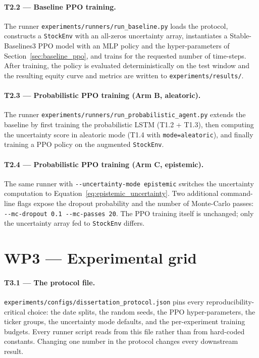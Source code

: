 \paragraph{T2.2 --- Baseline PPO training.} The runner \texttt{experiments/runners/run\_baseline.py} loads the protocol, constructs a \texttt{StockEnv} with an all-zeros uncertainty array, instantiates a Stable-Baselines3 PPO model with an MLP policy and the hyper-parameters of Section~\ref{sec:baseline_ppo}, and trains for the requested number of time-steps. After training, the policy is evaluated deterministically on the test window and the resulting equity curve and metrics are written to \texttt{experiments/results/}.

\paragraph{T2.3 --- Probabilistic PPO training (Arm B, aleatoric).} The runner \texttt{experiments/runners/run\_probabilistic\_agent.py} extends the baseline by first training the probabilistic LSTM (T1.2 + T1.3), then computing the uncertainty score in aleatoric mode (T1.4 with \texttt{mode=\textquotesingle aleatoric\textquotesingle}), and finally training a PPO policy on the augmented \texttt{StockEnv}.

\paragraph{T2.4 --- Probabilistic PPO training (Arm C, epistemic).} The same runner with \texttt{-{}-uncertainty-mode epistemic} switches the uncertainty computation to Equation~\ref{eq:epistemic_uncertainty}. Two additional command-line flags expose the dropout probability and the number of Monte-Carlo passes: \texttt{-{}-mc-dropout 0.1 -{}-mc-passes 20}. The PPO training itself is unchanged; only the uncertainty array fed to \texttt{StockEnv} differs.

\section{WP3 --- Experimental grid}
\label{sec:wp3}

\paragraph{T3.1 --- The protocol file.} \texttt{experiments/configs/dissertation\_protocol.json} pins every reproducibility-critical choice: the date splits, the random seeds, the PPO hyper-parameters, the ticker groups, the uncertainty mode defaults, and the per-experiment training budgets. Every runner script reads from this file rather than from hard-coded constants. Changing one number in the protocol changes every downstream result.


